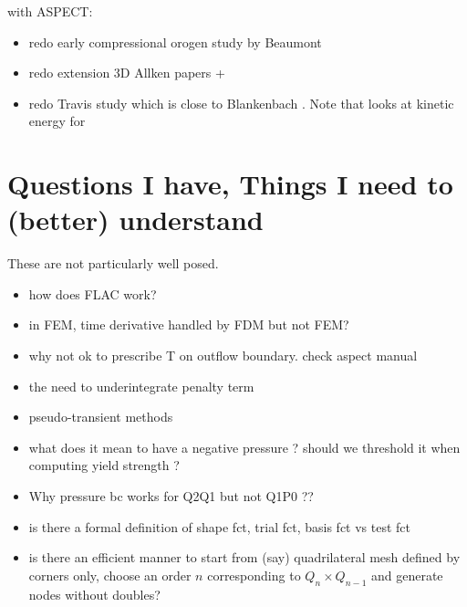 \documentclass[a4paper]{article}
\begin{document}
with ASPECT:

\begin{itemize}
\item redo early compressional orogen study by Beaumont \cite{bequ94}
\item redo extension 3D Allken papers + \cite{poay84,katl95} 
\item redo Travis study \cite{trab90} which is close to Blankenbach \cite{blbc89}. 
Note that \cite{maie12} looks at kinetic energy for \cite{trab90} 
\end{itemize}


\newpage
\section{Questions I have, Things I need to (better) understand}

These are not particularly well posed. 

\begin{itemize}
\item how does FLAC work?
\item in FEM, time derivative handled by FDM but not FEM?
\item why not ok to prescribe T on outflow boundary. check aspect manual
\item the need to underintegrate penalty term
\item pseudo-transient methods
\item what does it mean to have a negative pressure ? should we threshold it when computing yield strength ? 
\item Why pressure bc works for Q2Q1 but not Q1P0 ??
\item is there a formal definition of shape fct, trial fct, basis fct vs test fct 
\item is there an efficient manner to start from (say) quadrilateral mesh defined by corners only, choose an 
order $n$ corresponding to $Q_n \times Q_{n-1}$ and generate nodes without doubles?
\end{itemize}
\end{document}
